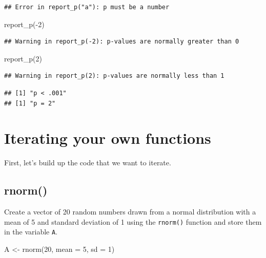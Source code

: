 \documentclass[
  oneside]{book}
\newenvironment{Shaded}{\begin{snugshade}}{\end{snugshade}}
\newcommand{\AttributeTok}[1]{\textcolor[rgb]{0.77,0.63,0.00}{#1}}
\newcommand{\DecValTok}[1]{\textcolor[rgb]{0.00,0.00,0.81}{#1}}
\newcommand{\FunctionTok}[1]{\textcolor[rgb]{0.00,0.00,0.00}{#1}}
\newcommand{\NormalTok}[1]{#1}
\newcommand{\OtherTok}[1]{\textcolor[rgb]{0.56,0.35,0.01}{#1}}
\newcommand{\SpecialCharTok}[1]{\textcolor[rgb]{0.00,0.00,0.00}{#1}}
\begin{document}
\begin{verbatim}
## Error in report_p("a"): p must be a number
\end{verbatim}

\begin{Shaded}
\begin{Highlighting}[]
\FunctionTok{report\_p}\NormalTok{(}\SpecialCharTok{{-}}\DecValTok{2}\NormalTok{)}
\end{Highlighting}
\end{Shaded}

\begin{verbatim}
## Warning in report_p(-2): p-values are normally greater than 0
\end{verbatim}

\begin{Shaded}
\begin{Highlighting}[]
\FunctionTok{report\_p}\NormalTok{(}\DecValTok{2}\NormalTok{)}
\end{Highlighting}
\end{Shaded}

\begin{verbatim}
## Warning in report_p(2): p-values are normally less than 1
\end{verbatim}

\begin{verbatim}
## [1] "p < .001"
## [1] "p = 2"
\end{verbatim}

\hypertarget{iterating-your-own-functions}{%
\section{Iterating your own functions}\label{iterating-your-own-functions}}

First, let's build up the code that we want to iterate.

\hypertarget{rnorm}{%
\subsection{rnorm()}\label{rnorm}}

Create a vector of 20 random numbers drawn from a normal distribution with a mean of 5 and standard deviation of 1 using the \texttt{rnorm()} function and store them in the variable \texttt{A}.

\begin{Shaded}
\begin{Highlighting}[]
\NormalTok{A }\OtherTok{\textless{}{-}} \FunctionTok{rnorm}\NormalTok{(}\DecValTok{20}\NormalTok{, }\AttributeTok{mean =} \DecValTok{5}\NormalTok{, }\AttributeTok{sd =} \DecValTok{1}\NormalTok{)}
\end{Highlighting}
\end{Shaded}
\end{document}
